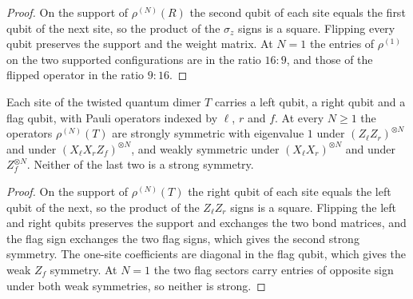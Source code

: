 \begin{proof}\leanok
    On the support of $\rho^{(N)}(R)$ the second qubit of each site equals
    the first qubit of the next site, so the product of the $\sigma_z$ signs
    is a square. Flipping every qubit preserves the support and the weight
    matrix. At $N=1$ the entries of $\rho^{(1)}$ on the two supported
    configurations are in the ratio $16:9$, and those of the flipped
    operator in the ratio $9:16$.
\end{proof}

\begin{lemma}\label{thm:mpdo_twisted_dimer_symmetries}
    \leanok
    Each site of the twisted quantum dimer $T$ carries a left qubit, a right
    qubit and a flag qubit, with Pauli operators indexed by $\ell$, $r$ and
    $f$. At every $N\ge 1$ the operators $\rho^{(N)}(T)$ are strongly
    symmetric with eigenvalue $1$ under $(Z_\ell Z_r)^{\otimes N}$ and under
    $(X_\ell X_rZ_f)^{\otimes N}$, and weakly symmetric under
    $(X_\ell X_r)^{\otimes N}$ and under $Z_f^{\otimes N}$. Neither of the
    last two is a strong symmetry.
\end{lemma}

\begin{proof}\leanok
    On the support of $\rho^{(N)}(T)$ the right qubit of each site equals the
    left qubit of the next, so the product of the $Z_\ell Z_r$ signs is a
    square. Flipping the left and right qubits preserves the support and exchanges the
    two bond matrices, and the flag sign exchanges the two flag signs, which
    gives the second strong symmetry. The one-site coefficients are diagonal
    in the flag qubit, which gives the weak $Z_f$ symmetry. At $N=1$ the
    two flag sectors carry entries of opposite sign under both weak
    symmetries, so neither is strong.
\end{proof}
